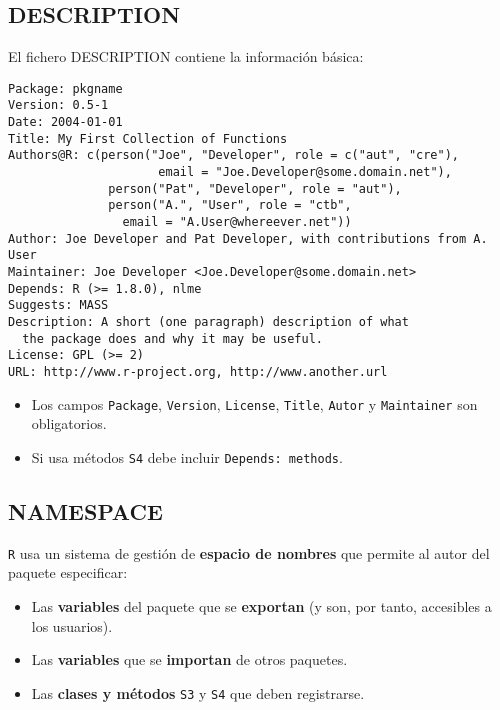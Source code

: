 \subsection{DESCRIPTION}
\label{sec:orgcf334d5}
\label{subsec:description}
El fichero DESCRIPTION contiene la información básica:
\begin{examplebox}
\begin{verbatim}
Package: pkgname
Version: 0.5-1
Date: 2004-01-01
Title: My First Collection of Functions
Authors@R: c(person("Joe", "Developer", role = c("aut", "cre"),
                     email = "Joe.Developer@some.domain.net"),
              person("Pat", "Developer", role = "aut"),
              person("A.", "User", role = "ctb",
     	        email = "A.User@whereever.net"))
Author: Joe Developer and Pat Developer, with contributions from A. User
Maintainer: Joe Developer <Joe.Developer@some.domain.net>
Depends: R (>= 1.8.0), nlme
Suggests: MASS
Description: A short (one paragraph) description of what
  the package does and why it may be useful.
License: GPL (>= 2)
URL: http://www.r-project.org, http://www.another.url
\end{verbatim}
\end{examplebox}
\begin{itemize}
\item Los campos \texttt{Package}, \texttt{Version}, \texttt{License}, \texttt{Title}, \texttt{Autor} y \texttt{Maintainer} son obligatorios.
\item Si usa métodos \texttt{S4} debe incluir \texttt{Depends: methods}.
\end{itemize}
\subsection{NAMESPACE}
\label{sec:orga249b97}
\label{subsec:namespace}
\texttt{R} usa un sistema de gestión de \textbf{espacio de nombres} que permite al autor del paquete especificar:
\begin{itemize}
\item Las \textbf{variables} del paquete que se \textbf{exportan} (y son, por tanto, accesibles a los usuarios).
\item Las \textbf{variables} que se \textbf{importan} de otros paquetes.
\item Las \textbf{clases y métodos} \texttt{S3} y \texttt{S4} que deben registrarse.
\end{itemize}


